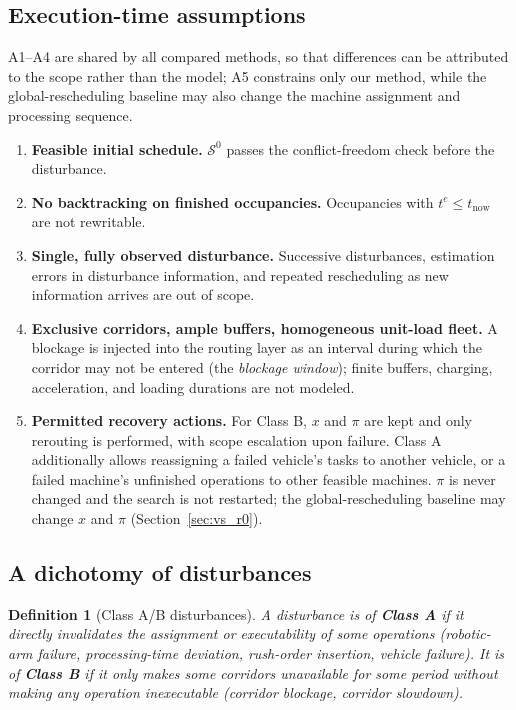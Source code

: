 \documentclass[manuscript,screen,review]{acmart}
\newtheorem{definition}{Definition}
\begin{document}
\subsection{Execution-time assumptions}
\label{sec:assumptions}

A1--A4 are shared by all compared methods, so that differences can be attributed to the scope rather than the model; A5 constrains only our method, while the global-rescheduling baseline may also change the machine assignment and processing sequence.
\begin{enumerate}[label=\textbf{A\arabic*.},leftmargin=*,topsep=2pt,itemsep=1pt]
\item \textbf{Feasible initial schedule.} \(\mathcal{S}^0\) passes the conflict-freedom check before the disturbance.
\item \textbf{No backtracking on finished occupancies.} Occupancies with \(t^e\le t_{\mathrm{now}}\) are not rewritable.
\item \textbf{Single, fully observed disturbance.} Successive disturbances, estimation errors in disturbance information, and repeated rescheduling as new information arrives are out of scope.
\item \textbf{Exclusive corridors, ample buffers, homogeneous unit-load fleet.} A blockage is injected into the routing layer as an interval during which the corridor may not be entered (the \emph{blockage window}); finite buffers, charging, acceleration, and loading durations are not modeled.
\item \textbf{Permitted recovery actions.} For Class B, \(x\) and \(\pi\) are kept and only rerouting is performed, with scope escalation upon failure.
Class A additionally allows reassigning a failed vehicle's tasks to another vehicle, or a failed machine's unfinished operations to other feasible machines. \(\pi\) is never changed and the search is not restarted;
the global-rescheduling baseline may change \(x\) and \(\pi\) (Section~\ref{sec:vs_r0}).
\end{enumerate}

\subsection{A dichotomy of disturbances}
\label{sec:disturbance_classes}

\begin{definition}[Class A/B disturbances]
\label{def:ab}
A disturbance is of \textbf{Class A} if it directly invalidates the assignment or \emph{executability} of some operations (robotic-arm failure, processing-time deviation, rush-order insertion, vehicle failure).
It is of \textbf{Class B} if it only makes some corridors unavailable for some period without making any operation inexecutable (corridor blockage, corridor slowdown).
\end{definition}
\end{document}
